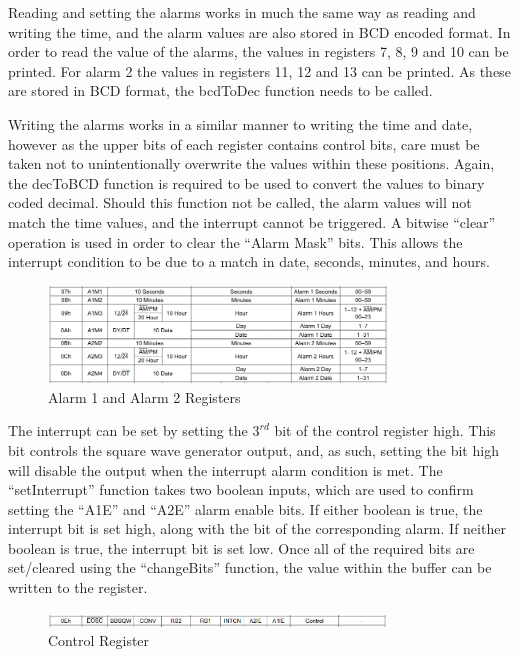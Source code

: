 Reading and setting the alarms works in much the same way as reading and writing
the time, and the alarm values are also stored in BCD encoded format. In
order to read the value of the alarms, the values in registers 7, 8, 9 and 10
can be printed. For alarm 2 the values in registers 11, 12 and 13 can be
printed. As these are stored in BCD format, the bcdToDec function
needs to be called.

Writing the alarms works in a similar manner to writing the time and date,
however as the upper bits of each register contains control bits, care must be
taken not to unintentionally overwrite the values within these positions. Again,
the decToBCD function is required to be used to convert the values to binary
coded decimal. Should this function not be called, the alarm values will not
match the time values, and the interrupt cannot be triggered. A bitwise
``clear'' operation is used in order to clear the ``Alarm Mask'' bits. This
allows the interrupt condition to be due to a match in date, seconds, minutes,
and hours.

\begin{figure}[H]
	\centering
	\includegraphics[width=0.8\textwidth]{images/alarmRegisters}
	\caption{Alarm 1 and Alarm 2 Registers}
	\label{fig:images-alarmRegister}
\end{figure}



The interrupt can be set by setting the $3^{rd}$ bit of the control register high.
This bit controls the square wave generator output, and, as such, setting the
bit high will disable the output when the interrupt alarm condition is met. The
``setInterrupt'' function takes two boolean inputs, which are used to confirm
setting the ``A1E'' and ``A2E'' alarm enable bits. If either boolean is true,
the interrupt bit is set high, along with the bit of the corresponding alarm. If
neither boolean is true, the interrupt bit is set low. Once all of the required
bits are set/cleared using the ``changeBits'' function, the value within the
buffer can be written to the register.

\begin{figure}[H]
	\centering
	\includegraphics[width=0.8\textwidth]{images/controlRegister}
	\caption{Control Register}
	\label{fig:images-controlRegister}
\end{figure}


